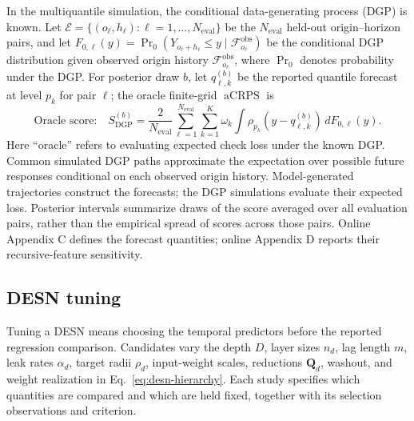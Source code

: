 \documentclass[12pt,letterpaper]{article}
\numberwithin{equation}{section}
\newcommand{\mat}[1]{\bm{#1}}
\newcommand{\aCRPS}{\operatorname{aCRPS}}
\begin{document}
In the multiquantile simulation, the conditional data-generating process
(DGP) is known. Let
\(\mathcal E=\{(o_\ell,h_\ell):\ell=1,\ldots,N_{\mathrm{eval}}\}\)
be the \(N_{\mathrm{eval}}\) held-out origin--horizon pairs, and let
\(F_{0,\ell}(y)=\Pr_0(Y_{o_\ell+h_\ell}\le y
\mid\mathcal F_{o_\ell}^{\mathrm{obs}})\)
be the conditional DGP distribution given observed origin history
\(\mathcal F_{o_\ell}^{\mathrm{obs}}\), where \(\Pr_0\) denotes probability
under the DGP. For posterior draw \(b\), let \(q_{\ell,k}^{(b)}\) be the
reported quantile forecast at level \(p_k\) for pair \(\ell\); the oracle
finite-grid \(\aCRPS\) is
\begin{equation}
\text{Oracle score:}\quad S_{\mathrm{DGP}}^{(b)}
=\frac{2}{N_{\mathrm{eval}}}\sum_{\ell=1}^{N_{\mathrm{eval}}}
\sum_{k=1}^K\omega_k
\int\rho_{p_k}\!\left(y-q_{\ell,k}^{(b)}\right)\,dF_{0,\ell}(y).
\label{eq:dgp-integrated-score-main}
\end{equation}
Here ``oracle'' refers to evaluating expected check loss under the known DGP.
Common simulated DGP paths approximate the expectation over possible future
responses conditional on each observed origin history. Model-generated
trajectories construct the forecasts; the DGP simulations evaluate their
expected loss. Posterior intervals
summarize draws of the score averaged over all evaluation pairs, rather than
the empirical spread of scores across those pairs. Online Appendix C defines
the forecast quantities; online Appendix D reports their recursive-feature
sensitivity.

\subsection{DESN tuning}
\label{sec:selection}

Tuning a DESN means choosing the temporal predictors before the reported
regression comparison. Candidates vary the depth \(D\), layer sizes
\(n_d\), lag length \(m\), leak rates \(\alpha_d\), target radii
\(\rho_d\), input-weight scales, reductions \(\mat Q_d\), washout, and
weight realization in Eq.~\eqref{eq:desn-hierarchy}. Each study specifies
which quantities are compared and which are held fixed, together with its
selection observations and criterion.
\end{document}
